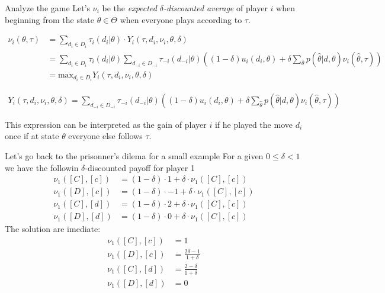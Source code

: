 \begin{frame}{Analyze the game}
Let's $\nu_i$ be the \textit{expected $\delta$-discounted average} of player $i$ when beginning from the state $\theta \in \Theta$ when everyone plays according to $\tau$.
\begin{small}
\begin{align*}
\nu_i(\theta, \tau) &=   \sum_{d_i \in D_i} \tau_i(d_i|\theta) \cdot Y_i(\tau, d_i, \nu_i, \theta, \delta)\\
&= \sum_{d_i \in D_i} \tau_i(d_i|\theta) \sum_{d_{-i} \in D_{-i}} \tau_{-i}(d_{-i} |\theta) \left( (1-\delta) u_i(d_i,\theta) + \delta \sum_{\hat{\theta}} p(\hat{\theta}|d,\theta) \nu_i(\hat{\theta},\tau) \right)  \\
&= \text{max}_{d_i \in D_i} Y_i(\tau, d_i, \nu_i, \theta, \delta)
\end{align*}
\end{small}
\begin{small}
\begin{align*}
Y_i(\tau, d_i, \nu_i, \theta, \delta) = \sum_{d_{-i} \in D_{-i}} \tau_{-i}(d_{-i} |\theta) \left( (1-\delta) u_i(d_i,\theta) + \delta \sum_{\hat{\theta}} p(\hat{\theta}|d,\theta) \nu_i(\hat{\theta},\tau) \right)
\end{align*}
\end{small}
This expression can be interpreted as the gain of player $i$ if he played the move $d_i$ once if at state $\theta$ everyone else follows $\tau$.
\end{frame}

\begin{frame}{Let's go back to the prisonner's dilema for a small example}
For a given $0 \leq \delta < 1$ we have the followin $\delta$-discounted payoff for player 1
	\begin{align*}
		\nu_1([C],[c]) &= (1-\delta) \cdot 1 + \delta \cdot \nu_1([C],[c])\\
		\nu_1([D],[c]) &= (1-\delta) \cdot -1 + \delta \cdot \nu_1([C],[c])\\
		\nu_1([C],[d]) &= (1-\delta) \cdot 2 + \delta \cdot \nu_1([C],[c])\\
		\nu_1([D],[d]) &= (1-\delta) \cdot 0 + \delta \cdot \nu_1([C],[c])
	\end{align*}
\pause
The solution are imediate:
\begin{align*}
	\nu_1([C],[c]) &= 1\\
	\nu_1([D],[c]) &= \frac{2\delta - 1}{1+\delta}\\
	\nu_1([C],[d]) &= \frac{2-\delta}{1+\delta}\\
	\nu_1([D],[d]) &= 0
\end{align*}
\end{frame}

